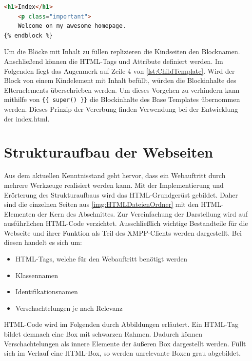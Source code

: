 \documentclass[a4paper,titlepage,halfparskip,12pt]{scrreprt}
\begin{document}
\begin{onehalfspacing}
\begin{lstlisting}[language=HTML,caption=Beispiel für Kindseite beim Vererbungsprinzip von Jinja,label={lst:ChildTemplate}]
	<h1>Index</h1>
	<p class="important">
	Welcome on my awesome homepage.
{% endblock %}
\end{lstlisting}
Um die Blöcke mit Inhalt zu füllen replizieren die Kindseiten den Blocknamen. Anschließend können die HTML-Tags und Attribute definiert werden. Im Folgenden liegt das Augenmerk auf Zeile 4 von \autoref{lst:ChildTemplate}. Wird der Block von einem Kindelement mit Inhalt befüllt, würden die Blockinhalte des Elternelements überschrieben werden. Um dieses Vorgehen zu verhindern kann mithilfe von \texttt{\{\{ super() \}\}} die Blockinhalte des Base Templates übernommen werden. Dieses Prinzip der Vererbung finden Verwendung bei der Entwicklung der index.html. \cite{FlaskTempInherDoc}

\section{Strukturaufbau der Webseiten}
\label{subsec:StrukturaufbauWebseiten}
Aus dem aktuellen Kenntnisstand geht hervor, dass ein Webauftritt durch mehrere Werkzeuge realisiert werden kann. Mit der Implementierung und Erörterung des Strukturaufbaus wird das HTML-Grundgerüst gebildet. Daher sind die einzelnen Seiten aus \autoref{img:HTMLDateienOrdner} mit den HTML-Elementen der Kern des Abschnittes. Zur Vereinfachung der Darstellung wird auf ausführlichen HTML-Code verzichtet. Ausschließlich wichtige Bestandteile für die Webseite und ihrer Funktion als Teil des XMPP-Clients werden dargestellt. Bei diesen handelt es sich um:
\begin{itemize}
	\item HTML-Tags, welche für den Webauftritt benötigt werden
	\item Klassennamen
	\item Identifikationsnamen
	\item Verschachtelungen je nach Relevanz
\end{itemize}
HTML-Code wird im Folgenden durch Abbildungen erläutert. Ein HTML-Tag bildet demnach eine Box mit schwarzen Rahmen. Dadurch können Verschachtelungen als innere Elemente der äußeren Box dargestellt werden. Füllt sich im Verlauf eine HTML-Box, so werden unrelevante Boxen grau abgebildet.


\end{onehalfspacing}
\end{document}
